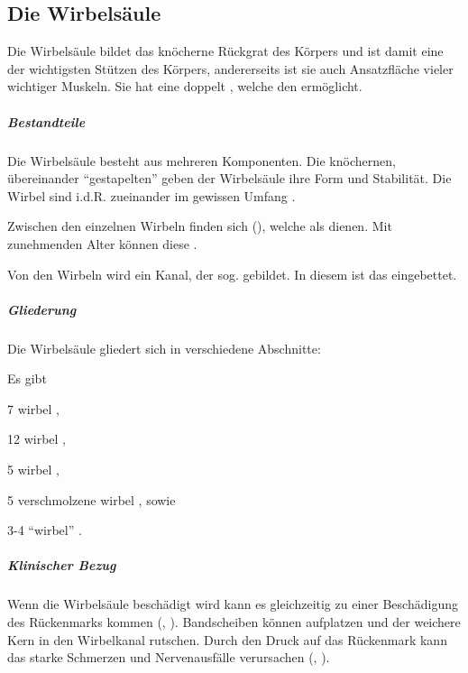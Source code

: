 \subsection{Die Wirbelsäule}
{
Die Wirbelsäule bildet das knöcherne Rückgrat des Körpers und ist damit eine
der wichtigsten Stützen des Körpers, andererseits ist sie auch Ansatzfläche
vieler wichtiger Muskeln. Sie hat eine doppelt ,
welche den  ermöglicht.

\subparagraph{Bestandteile}
Die Wirbelsäule besteht aus mehreren Komponenten. Die knöchernen, übereinander
"`gestapelten"'   geben der Wirbelsäule ihre Form
und Stabilität. Die Wirbel sind i.d.R. zueinander im gewissen Umfang
.

Zwischen den
einzelnen Wirbeln finden sich 
(), welche als  dienen. Mit zunehmenden Alter können
diese . 
    
Von den Wirbeln wird ein Kanal, der sog. 
gebildet. In diesem ist das  eingebettet.

\subparagraph{Gliederung} Die Wirbelsäule gliedert sich in verschiedene
Abschnitte: 

Es gibt 
\begin{inparaitem}
    \item 7 wirbel ,
    \item 12 wirbel  ,
    \item 5 wirbel  ,
    \item 5 verschmolzene wirbel , sowie
    \item 3-4 "`wirbel"' .
\end{inparaitem}

\subparagraph{Klinischer Bezug} Wenn die Wirbelsäule beschädigt wird kann es
gleichzeitig zu einer Beschädigung des Rückenmarks kommen
(, ). Bandscheiben
können aufplatzen und der weichere Kern in den Wirbelkanal rutschen. Durch
den Druck auf das Rückenmark kann das starke Schmerzen und
Nervenausfälle verursachen (,
).


}
